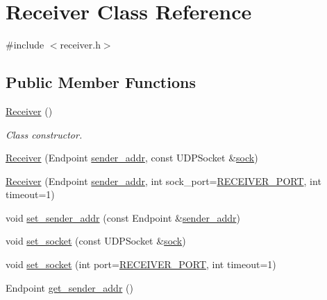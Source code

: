 \hypertarget{classReceiver}{}\section{Receiver Class Reference}
\label{classReceiver}


{\ttfamily \#include $<$receiver.\+h$>$}

\subsection*{Public Member Functions}
\begin{DoxyCompactItemize}
\item 
\hyperlink{classReceiver_ab05f062ad8bc9105e7708c9567552908}{Receiver} ()\hypertarget{classReceiver_ab05f062ad8bc9105e7708c9567552908}{}\label{classReceiver_ab05f062ad8bc9105e7708c9567552908}

\begin{DoxyCompactList}\small\item\em Class constructor. \end{DoxyCompactList}\item 
\hyperlink{classReceiver_ab8501781dc63233c0c82b499451b08f2}{Receiver} (Endpoint \hyperlink{classReceiver_a94cc9b9a270087ba74c1585978cab38f}{sender\+\_\+addr}, const U\+D\+P\+Socket \&\hyperlink{classReceiver_a54d729b5fefa143500429505375efd68}{sock})
\item 
\hyperlink{classReceiver_abccccb3afe6587839f5dd11c80fdf0b2}{Receiver} (Endpoint \hyperlink{classReceiver_a94cc9b9a270087ba74c1585978cab38f}{sender\+\_\+addr}, int sock\+\_\+port=\hyperlink{protocol_8h_a714d0c166e470fe1d95e17305a084931}{R\+E\+C\+E\+I\+V\+E\+R\+\_\+\+P\+O\+RT}, int timeout=1)
\item 
void \hyperlink{classReceiver_aa147f9f403f704d98610892f3e5adf95}{set\+\_\+sender\+\_\+addr} (const Endpoint \&\hyperlink{classReceiver_a94cc9b9a270087ba74c1585978cab38f}{sender\+\_\+addr})
\item 
void \hyperlink{classReceiver_af87898ab72d053f1650540c2fa2947d0}{set\+\_\+socket} (const U\+D\+P\+Socket \&\hyperlink{classReceiver_a54d729b5fefa143500429505375efd68}{sock})
\item 
void \hyperlink{classReceiver_acc405024239f1975412f575e91aa5a8f}{set\+\_\+socket} (int port=\hyperlink{protocol_8h_a714d0c166e470fe1d95e17305a084931}{R\+E\+C\+E\+I\+V\+E\+R\+\_\+\+P\+O\+RT}, int timeout=1)
\item 
Endpoint \hyperlink{classReceiver_ad61317d8e3a6963d69a6c9669d06c6b5}{get\+\_\+sender\+\_\+addr} ()\hypertarget{classReceiver_ad61317d8e3a6963d69a6c9669d06c6b5}{}\label{classReceiver_ad61317d8e3a6963d69a6c9669d06c6b5}


\end{DoxyCompactItemize}
